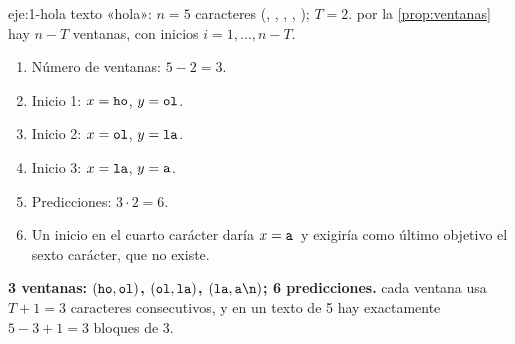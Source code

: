 \begin{solucion}{eje:1-hola}
\datos texto «hola\nl»: $n=5$ caracteres (, , , , \nl); $T=2$.
\planteamiento por la \cref{prop:ventanas} hay $n-T$ ventanas, con inicios $i=1,\dots,n-T$.
\pasos
\begin{enumerate}[label=\arabic*.]
  \item Número de ventanas: $5-2=3$.
  \item Inicio 1: $x=\texttt{ho}$, $y=\texttt{ol}$.
  \item Inicio 2: $x=\texttt{ol}$, $y=\texttt{la}$.
  \item Inicio 3: $x=\texttt{la}$, $y=\texttt{a}$\nl.
  \item Predicciones: $3\cdot 2=6$.
  \item Un inicio en el cuarto carácter daría $x=\texttt{a}$\nl\ y exigiría como último objetivo el sexto carácter, que no existe.
\end{enumerate}
\resultado \textbf{3 ventanas: $(\texttt{ho},\texttt{ol})$, $(\texttt{ol},\texttt{la})$, $(\texttt{la},\texttt{a}\texttt{\textbackslash n})$; 6 predicciones.}
\comprobacion cada ventana usa $T+1=3$ caracteres consecutivos, y en un texto de 5 hay exactamente $5-3+1=3$ bloques de 3.
\end{solucion}

